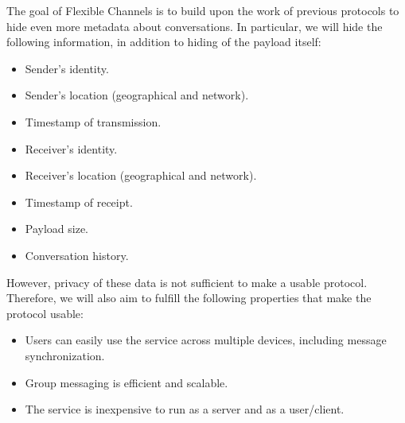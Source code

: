 The goal of Flexible Channels is to build upon the work of previous protocols to hide even more metadata about conversations. In particular, we will hide the following information, in addition to hiding of the payload itself:

\begin{itemize}
\item
  Sender's identity.
\item
  Sender's location (geographical and network).
\item
  Timestamp of transmission.
\item
  Receiver's identity.
\item
  Receiver's location (geographical and network).
\item
  Timestamp of receipt.
\item
  Payload size.
\item
  Conversation history.
\end{itemize}

However, privacy of these data is not sufficient to make a usable protocol. Therefore, we will also aim to fulfill the following properties that make the protocol usable:

\begin{itemize}
\item
  Users can easily use the service across multiple devices, including message synchronization.
\item
  Group messaging is efficient and scalable.
\item
  The service is inexpensive to run as a server and as a user/client.
\end{itemize}
